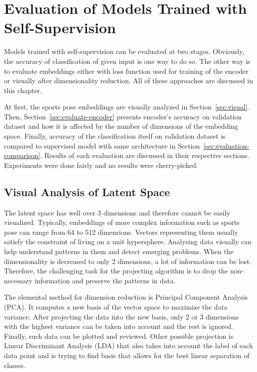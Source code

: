 \chapter{\label{chap:evaluation}Evaluation of Models Trained with Self-Supervision}

Models trained with self-supervision can be evaluated at two stages. Obviously, the accuracy of classification of given input is one way to do so. The other way is to evaluate embeddings either with loss function used for training of the encoder or visually after dimensionality reduction. All of these approaches are discussed in this chapter.

At first, the sports pose embeddings are visually analyzed in Section~\ref{sec:visual}. Then, Section~\ref{sec:evaluate-encoder} presents encoder's accuracy on validation dataset and how it is affected by the number of dimensions of the embedding space. Finally, accuracy of the classification itself on validation dataset is compared to supervised model with same architecture in Section~\ref{sec:evaluation-comparison}. Results of each evaluation are discussed in their respective sections. Experiments were done fairly and no results were cherry-picked.

\section{\label{sec:visual}Visual Analysis of Latent Space}

The latent space has well over 3 dimensions and therefore cannot be easily visualized. Typically, embeddings of more complex information such as sports pose can range from 64 to 512 dimensions. Vectors representing them usually satisfy the constraint of living on a unit hypersphere. Analysing data visually can help understand patterns in them and detect emerging problems. When the dimensionality is decreased to only 2 dimensions, a lot of information can be lost. Therefore, the challenging task for the projecting algorithm is to drop the non-necessary information and preserve the patterns in data.

The elemental method for dimension reduction is Principal Component Analysis (PCA). It computes a new basis of the vector space to maximize the data variance. After projecting the data into the new basis, only 2 or 3 dimensions with the highest variance can be taken into account and the rest is ignored. Finally, such data can be plotted and reviewed. Other possible projection is Linear Discriminant Analysis (LDA) that also takes into account the label of each data point and is trying to find basis that allows for the best linear separation of classes.

